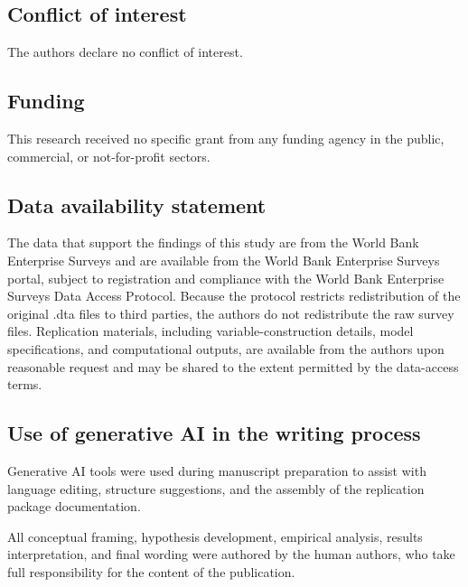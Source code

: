 \documentclass[12pt,a4paper]{article}
\begin{document}
\hypertarget{conflict-of-interest}{%
\subsection{Conflict of interest}\label{conflict-of-interest}}

The authors declare no conflict of interest.

\hypertarget{funding}{%
\subsection{Funding}\label{funding}}

This research received no specific grant from any funding agency in the
public, commercial, or not-for-profit sectors.

\hypertarget{data-availability-statement}{%
\subsection{Data availability
statement}\label{data-availability-statement}}

The data that support the findings of this study are from the World Bank
Enterprise Surveys and are available from the World Bank Enterprise
Surveys portal, subject to registration and compliance with the World
Bank Enterprise Surveys Data Access Protocol. Because the protocol
restricts redistribution of the original .dta files to third parties,
the authors do not redistribute the raw survey files. Replication
materials, including variable-construction details, model
specifications, and computational outputs, are available from the
authors upon reasonable request and may be shared to the extent
permitted by the data-access terms.

\hypertarget{use-of-generative-ai-in-the-writing-process}{%
\subsection{Use of generative AI in the writing
process}\label{use-of-generative-ai-in-the-writing-process}}

Generative AI tools were used during manuscript preparation to assist
with language editing, structure suggestions, and the assembly of the
replication package documentation.

All conceptual framing, hypothesis development, empirical analysis,
results interpretation, and final wording were authored by the human
authors, who take full responsibility for the content of the
publication.
\end{document}
